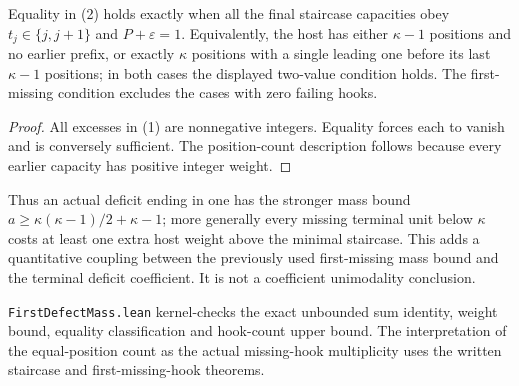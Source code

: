 \begin{corollary}
Equality in (2) holds exactly when all the final staircase
capacities obey $t_j\in\{j,j+1\}$ and $P+\varepsilon=1$.
Equivalently, the host has either $\kappa-1$ positions and
no earlier prefix, or exactly $\kappa$ positions with a
single leading one before its last $\kappa-1$ positions;
in both cases the displayed two-value condition holds.
The first-missing condition excludes the cases with zero
failing hooks.
\end{corollary}
\begin{proof}
All excesses in (1) are nonnegative integers. Equality
forces each to vanish and is conversely sufficient.
The position-count description follows because every
earlier capacity has positive integer weight.
\end{proof}

Thus an actual deficit ending in one has the stronger
mass bound $a\ge\kappa(\kappa-1)/2+\kappa-1$; more
generally every missing terminal unit below $\kappa$
costs at least one extra host weight above the minimal
staircase. This adds a quantitative coupling between
the previously used first-missing mass bound and the
terminal deficit coefficient. It is not a coefficient
unimodality conclusion.

\texttt{FirstDefectMass.lean} kernel-checks the exact
unbounded sum identity, weight bound, equality classification
and hook-count upper bound. The interpretation of the
equal-position count as the actual missing-hook multiplicity
uses the written staircase and first-missing-hook theorems.

